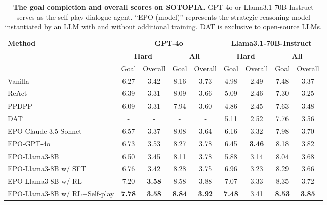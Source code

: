 \begin{table*}[ht]
\centering
\begin{tabular}{lcccc|cccc}
\toprule
\multirow{3}{*}{\textbf{Method}}&\multicolumn{4}{c}{\textbf{GPT-4o}} & \multicolumn{4}{c}{\textbf{Llama3.1-70B-Instruct}} \\
&\multicolumn{2}{c}{\textbf{Hard}} & \multicolumn{2}{c}{\textbf{All}} &  \multicolumn{2}{c}{\textbf{Hard}} & \multicolumn{2}{c}{\textbf{All}} \\
&{\small Goal} & {\small Overall} & {\small Goal} & {\small Overall} & {\small Goal} & {\small Overall} & {\small Goal} & {\small Overall} \\
\midrule
Vanilla  & 6.27 & 3.42 & 8.16 & 3.73 & 4.98 & 2.49 & 7.48 & 3.37 \\
ReAct~\cite{yao2023react} & 6.39 & 3.31 & 8.09 & 3.66 & 5.09 & 2.46 & 7.30 & 3.25 \\
PPDPP~\cite{deng2023plug}  & 6.09 & 3.31 & 7.94 & 3.60 & 4.86 & 2.45 & 7.63 & 3.48 \\
DAT~\cite{li2024dialogue} & - & - & - & - & 5.11 & 2.52 & 7.76 & 3.56 \\
\midrule
EPO-Claude-3.5-Sonnet & 6.57 & 3.37 & 8.08 & 3.64 & 6.16 & 3.32 & 7.98 & 3.70 \\
EPO-GPT-4o & 6.73 & 3.53 & 8.27 & 3.78 & 6.45 & \textbf{3.46} & 8.18 & 3.82 \\
EPO-Llama3-8B & 6.50 & 3.45 & 8.11 & 3.78 & 5.88 & 3.14 & 8.04 & 3.68 \\
EPO-Llama3-8B w/ SFT & 6.76 & 3.42 & 8.28 & 3.75 & 6.96 & 3.23 & 8.29 & 3.66 \\
EPO-Llama3-8B w/ RL & 7.20 & \textbf{3.58} & 8.58 & 3.88 & 7.07 & 3.33 & 8.35 & 3.72 \\
EPO-Llama3-8B w/ RL+Self-play & \textbf{7.78} & \textbf{3.58} & \textbf{8.84} & \textbf{3.92} & \textbf{7.48} & 3.41 & \textbf{8.53} & \textbf{3.85} \\
\bottomrule
\end{tabular}
\caption{\textbf{The goal completion and overall scores on SOTOPIA.}
GPT-4o or Llama3.1-70B-Instruct serves as the self-play dialogue agent.
``EPO-(model)'' represents the strategic reasoning model instantiated by an LLM with and without additional training. 
DAT is exclusive to open-source LLMs.
}
\label{tab:sotopia-result}
\end{table*}

